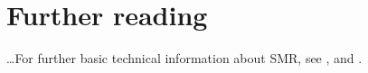 \section{Further reading}
\label{sec:reading}
%
\dots For further basic technical information about SMR, see
\citet{eriksson:studi:02}, \citet{merino:studi:02} and
\citet{murtagh:anove:02}.






